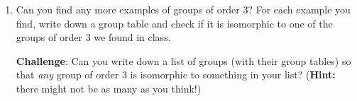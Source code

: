 \documentclass[10pt, letterpaper]{article}
\begin{document}
\begin{enumerate}
\item Can you find any more examples of groups of order $3$? For each
  example you find, write down a group table and check if it is
  isomorphic to one of the groups of order $3$ we found in class.

  \textbf{Challenge}: Can you write down a list of groups (with their
  group tables) so that \emph{any} group of order $3$ is isomorphic to
  something in your list? (\textbf{Hint:} there might not be as many as
  you think!)

\end{enumerate}
\end{document}
